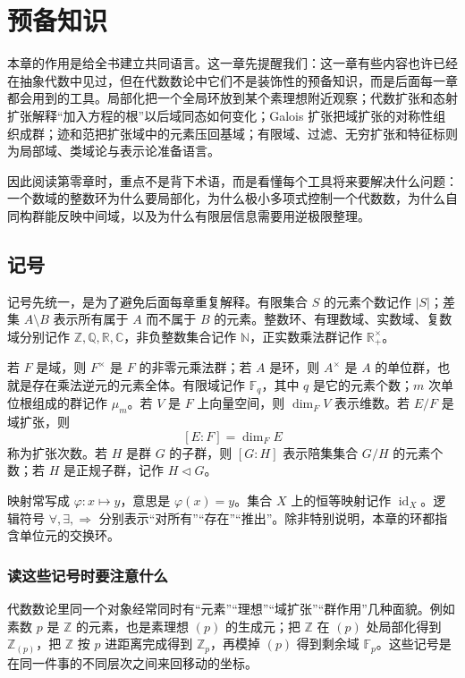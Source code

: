 \documentclass[11pt,a4paper,openany]{ctexbook}
\numberwithin{equation}{chapter}
\newcommand{\Q}{\mathbb{Q}}
\newcommand{\R}{\mathbb{R}}
\newcommand{\C}{\mathbb{C}}
\newcommand{\Z}{\mathbb{Z}}
\newcommand{\N}{\mathbb{N}}
\newcommand{\F}{\mathbb{F}}
\theoremstyle{plain}
\theoremstyle{definition}
\theoremstyle{remark}
\begin{document}
\frontmatter
\tableofcontents

\mainmatter
\setcounter{chapter}{-1}
\chapter{预备知识}

本章的作用是给全书建立共同语言。这一章先提醒我们：这一章有些内容也许已经在抽象代数中见过，但在代数数论中它们不是装饰性的预备知识，而是后面每一章都会用到的工具。局部化把一个全局环放到某个素理想附近观察；代数扩张和态射扩张解释“加入方程的根”以后域同态如何变化；Galois 扩张把域扩张的对称性组织成群；迹和范把扩张域中的元素压回基域；有限域、过滤、无穷扩张和特征标则为局部域、类域论与表示论准备语言。

因此阅读第零章时，重点不是背下术语，而是看懂每个工具将来要解决什么问题：一个数域的整数环为什么要局部化，为什么极小多项式控制一个代数数，为什么自同构群能反映中间域，以及为什么有限层信息需要用逆极限整理。

\section*{记号}
{}

记号先统一，是为了避免后面每章重复解释。有限集合 $S$ 的元素个数记作 $|S|$；差集 $A\setminus B$ 表示所有属于 $A$ 而不属于 $B$ 的元素。整数环、有理数域、实数域、复数域分别记作 $\Z,\Q,\R,\C$，非负整数集合记作 $\N$，正实数乘法群记作 $\R_{+}^{\times}$。

若 $F$ 是域，则 $F^\times$ 是 $F$ 的非零元乘法群；若 $A$ 是环，则 $A^\times$ 是 $A$ 的单位群，也就是存在乘法逆元的元素全体。有限域记作 $\F_q$，其中 $q$ 是它的元素个数；$m$ 次单位根组成的群记作 $\mu_m$。若 $V$ 是 $F$ 上向量空间，则 $\dim_F V$ 表示维数。若 $E/F$ 是域扩张，则
\[
[E:F]=\dim_F E
\]
称为扩张次数。若 $H$ 是群 $G$ 的子群，则 $[G:H]$ 表示陪集集合 $G/H$ 的元素个数；若 $H$ 是正规子群，记作 $H\triangleleft G$。

映射常写成 $\varphi:x\mapsto y$，意思是 $\varphi(x)=y$。集合 $X$ 上的恒等映射记作 $\operatorname{id}_X$。逻辑符号 $\forall,\exists,\Rightarrow$ 分别表示“对所有”“存在”“推出”。除非特别说明，本章的环都指含单位元的交换环。

\subsection*{读这些记号时要注意什么}

代数数论里同一个对象经常同时有“元素”“理想”“域扩张”“群作用”几种面貌。例如素数 $p$ 是 $\Z$ 的元素，也是素理想 $(p)$ 的生成元；把 $\Z$ 在 $(p)$ 处局部化得到 $\Z_{(p)}$，把 $\Z$ 按 $p$ 进距离完成得到 $\Z_p$，再模掉 $(p)$ 得到剩余域 $\F_p$。这些记号是在同一件事的不同层次之间来回移动的坐标。
\end{document}
